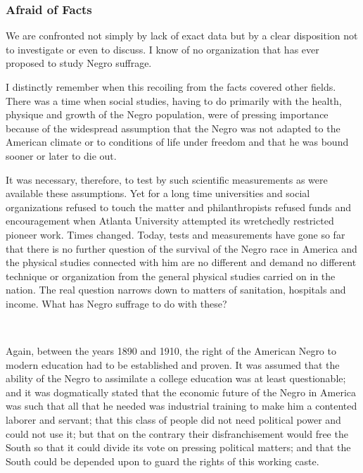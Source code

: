 \documentclass[letterpaper,10pt,english]{jupyterBook}
\begin{document}
\subsubsection{Afraid of Facts}
\label{\detokenize{Volumes/36/05/negro_citizen:afraid-of-facts}}
\sphinxAtStartPar
We are confronted not simply by lack of exact data but by a clear disposition not to investigate or even to discuss. I know of no organization that has ever proposed to study Negro suffrage.

\sphinxAtStartPar
I distinctly remember when this recoiling from the facts covered other fields. There was a time when social studies, having to do primarily with the health, physique and growth of the Negro population, were of pressing importance because of the widespread assumption that the Negro was not adapted to the American climate or to conditions of life under freedom and that he was bound sooner or later to die out.

\sphinxAtStartPar
It was necessary, therefore, to test by such scientific measurements as were available these assumptions. Yet for a long time universities and social organizations refused to touch the matter and philanthropists refused funds and encouragement when Atlanta University attempted its wretchedly restricted pioneer work. Times changed. Today, tests and measurements have gone so far that there is no further question of the survival of the Negro race in America and the physical studies connected with him are no different and demand no different technique or organization from the general physical studies carried on in the nation. The real question narrows down to matters of sanitation, hospitals and income. What has Negro suffrage to do with these?

\sphinxAtStartPar
 

\sphinxAtStartPar
Again, between the years 1890 and 1910, the right of the American Negro to modern education had to be established and proven. It was assumed that the ability of the Negro to assimilate a college education was at least questionable; and it was dogmatically stated that the economic future of the Negro in America was such that all that he needed was industrial training to make him a contented laborer and servant; that this class of people did not need political power and could not use it; but that on the contrary their disfranchisement would free the South so that it could divide its vote on pressing political matters; and that the South could be depended upon to guard the rights of this working caste.
\end{document}
